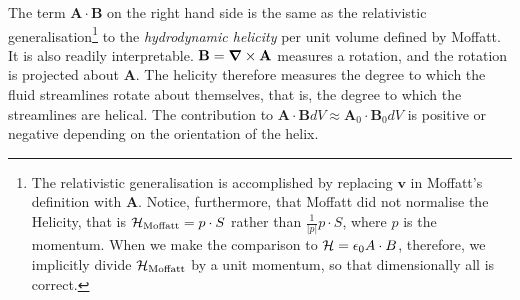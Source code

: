 \documentclass[10pt, fleqn,final,showtrims,oldfontcommands]{article} %
\newcommand{\eqnref}[1]{\ref{eqn:#1}}
\newcommand{\lr}[1]{\left( #1 \right)}
\newcommand{\del}{\nabla}
\newcommand{\vdel}{ \mbox{\boldmath $\del$}}
\newcommand{\abs}[1]{\left| #1 \right|}
\newcommand{\half}{\tfrac{1}{2}}
\newcommand{\vE}{\vect E}
\newcommand{\vB}{\vect B}
\newcommand{\vP}{\vect P}
\newcommand{\bivector}[1]{{\left< #1 \right>_2}}
\newcommand{\g}{\gamma_0}
\renewcommand{\H}{{\cal H}}
\newcommand{\vect}[1]{\mathbf{#1}}
\newcommand{\vA}{\textbf{A}}
\newcommand{\vv}{\textbf{v}}
\begin{document}
 The term $\vA \cdot \vB$ on the right hand side is the same as the 
relativistic generalisation\footnote{ \label{footnote:dimensionallity_footnote}
The relativistic generalisation is accomplished by replacing $\vv$ in Moffatt's definition with $\vA$.
Notice, furthermore, that Moffatt did not normalise the Helicity,
that is $\H_{\text{Moffatt}} = p\cdot S$ rather than $\frac{1}{\abs{p}}p\cdot S$,
where $p$ is the momentum.
When we make the comparison to $\H = \epsilon_0 A\cdot B$, therefore,
we implicitly divide $\H_{\text{Moffatt}}$ by a unit momentum,
so that dimensionally all is correct.
} to the
{\em hydrodynamic helicity} per unit volume defined by Moffatt\cite{Moffatt1969}.
It is also  readily interpretable.
$\vB = \vdel \times \vA$ measures a rotation,
and the rotation is projected about  $\vA$.
The helicity therefore measures the degree to which the fluid streamlines rotate about themselves,
that is, the degree to which the streamlines are helical\cite{Moffatt1969, Ranada1992}.
The contribution to $\vA \cdot \vB dV \approx \vA_0\cdot \vB_0 dV$
is positive or negative depending on the orientation of the helix\cite{Moffatt1969}.
\end{document}
